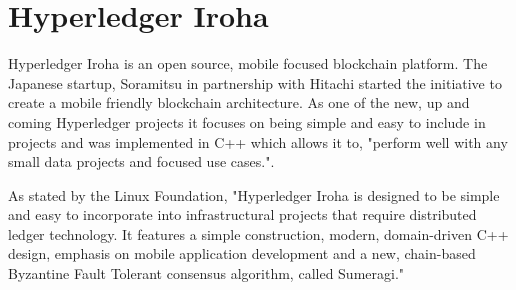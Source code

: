 \section{Hyperledger Iroha}

Hyperledger Iroha is an open source, mobile focused blockchain platform. The Japanese startup, 
Soramitsu in partnership with Hitachi started the initiative to create a mobile friendly 
blockchain architecture. As one of the new, up and coming Hyperledger projects it focuses on being
simple and easy to include in projects and was implemented in C++ which allows it to, "perform well 
with any small data projects and focused use cases."\cite{Behlendorf,Brian}.

As stated by the Linux Foundation, "Hyperledger Iroha is designed to be simple and easy to incorporate 
into infrastructural projects that require distributed ledger technology. It features a simple 
construction, modern, domain-driven C++ design, emphasis on mobile application development and a new, 
chain-based Byzantine Fault Tolerant consensus algorithm, called Sumeragi."\cite{Active Status Iroha}
